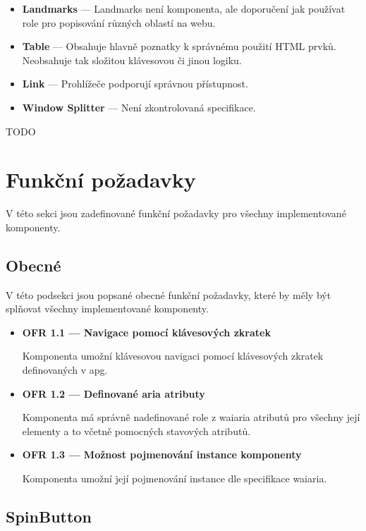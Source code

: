 \begin{itemize}
    \item \textbf{Landmarks} --- Landmarks není komponenta, ale doporučení jak používat role pro popisování různých oblastí na webu.
    \item \textbf{Table} --- Obsahuje hlavně poznatky k správnému použití HTML prvků. Neobsahuje tak složitou klávesovou či jinou logiku.
    \item \textbf{Link} --- Prohlížeče podporují správnou přístupnost.
    \item \textbf{Window Splitter} --- Není zkontrolovaná specifikace.
\end{itemize}

TODO

\section{Funkční požadavky}

V této sekci jsou zadefinované funkční požadavky pro všechny implementované komponenty.

\subsection{Obecné}

V této podsekci jsou popsané obecné funkční požadavky, které by měly být splňovat všechny implementované komponenty.

\begin{itemize}
    \item \textbf{OFR 1.1 --- Navigace pomocí klávesových zkratek}\label{ofr11}

          Komponenta umožní klávesovou navigaci pomocí klávesových zkratek definovaných v \gls{apg}.

    \item \textbf{OFR 1.2 --- Definované aria atributy}\label{ofr12}

          Komponenta má správně nadefinované role z \gls{waiaria} atributů pro všechny její elementy a to včetně pomocných stavových atributů.

    \item \textbf{OFR 1.3 --- Možnost pojmenování instance komponenty}\label{ofr13}

          Komponenta umožní její pojmenování instance dle specifikace \gls{waiaria}.
\end{itemize}


\subsection{SpinButton}

